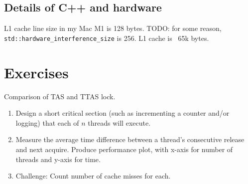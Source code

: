 \subsection{Details of C++ and hardware}
L1 cache line size in my Mac M1 is 128 bytes. TODO: for some reason, \verb|std::hardware_interference_size| is 256. L1 cache is ~65k bytes.

\section{Exercises}
\begin{exercise}
    Comparison of TAS and TTAS lock.
    \begin{enumerate}
        \item Design a short critical section (such as incrementing a counter and/or logging) that each of $n$ threads will execute.
        \item Measure the average time difference between a thread's consecutive release and next acquire. Produce performance plot, with x-axis for number of threads and y-axis for time.
        \item Challenge: Count number of cache misses for each.
    \end{enumerate}
\end{exercise}

